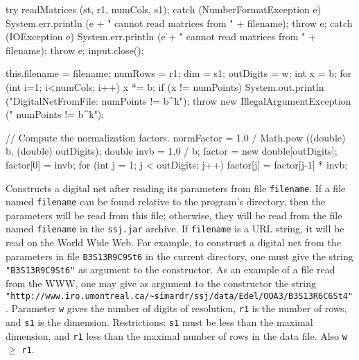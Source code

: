 \begin{code}
\begin{hide}
{      try {
         readMatrices (st, r1, numCols, s1);
      } catch (NumberFormatException e) {
         System.err.println (e + "   cannot read matrices from " + filename);
         throw e;
      }  catch (IOException e) {
         System.err.println (e + "   cannot read matrices from  " + filename);
         throw e;
      }
      input.close();

      this.filename = filename;
      numRows = r1;
      dim = s1;
      outDigits = w;
      int x = b;
      for (int i=1; i<numCols; i++) x *= b;
      if (x != numPoints) {
         System.out.println ("DigitalNetFromFile:   numPoints != b^k");
         throw new IllegalArgumentException (" numPoints != b^k");
      }

      // Compute the normalization factors.
      normFactor = 1.0 / Math.pow ((double) b, (double) outDigits);
      double invb = 1.0 / b;
      factor = new double[outDigits];
      factor[0] = invb;
      for (int j = 1; j < outDigits; j++)
         factor[j] = factor[j-1] * invb;
  }\end{hide}
\end{code}
\begin{tabb}
    Constructs a digital net after reading its parameters from file
    {\texttt{filename}}. If a file named \texttt{filename}
   can be found relative to the program's directory, then the parameters
   will be read from this file; otherwise, they will be read from the file
   named  \texttt{filename} in the \texttt{ssj.jar} archive.
   If {\texttt{filename}} is a URL string, it will be read on
   the World Wide Web.
   For example, to construct a digital net from the parameters in file
   \texttt{B3S13R9C9St6} in the current directory,  one must give the string
   \texttt{"B3S13R9C9St6"} as argument to the constructor.
   As an example of a file read from the WWW, one may give
   as argument to the constructor the string
   \texttt{
  "http://www.iro.umontreal.ca/\~{}simardr/ssj/data/Edel/OOA3/B3S13R6C6St4"}.
   Parameter \texttt{w} gives the number of digits of resolution, \texttt{r1} is
   the number of rows, and \texttt{s1} is the dimension.
   Restrictions: \texttt{s1} must be less than the maximal dimension, and
   \texttt{r1} less than the maximal number of rows in the data file.
   Also \texttt{w} $\ge$ \texttt{r1}.
\end{tabb}
\begin{htmlonly}
\end{htmlonly}
